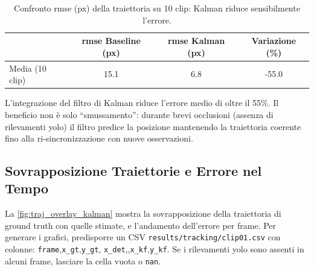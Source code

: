 \documentclass[12pt,a4paper,openright,twoside]{book}
\begin{document}
\begin{table}[t]
  \centering
  \caption{Confronto \ac{rmse} (px) della traiettoria su 10 clip: 
  Kalman riduce sensibilmente l'errore.}
  \label{tab:ablation_kalman}
  \begin{tabular}{l S[table-format=2.1] 
    S[table-format=2.1] S[table-format=2.1]}
    \toprule
    & {\textbf{\ac{rmse} Baseline (px)}} & {\textbf{\ac{rmse} Kalman (px)}} 
    & {\textbf{Variazione (\%)}} \\
    \midrule
    Media (10 clip) & 15.1 & 6.8 & -55.0 \\
    \bottomrule
  \end{tabular}
\end{table}

L'integrazione del filtro di Kalman riduce l'errore medio di oltre il 55\%. 
Il beneficio non è solo ``smussamento'': durante brevi occlusioni 
(assenza di rilevamenti \ac{yolo}) il filtro predice la posizione 
mantenendo la traiettoria coerente fino alla ri-sincronizzazione 
con nuove osservazioni.

\subsection{Sovrapposizione Traiettorie e Errore nel Tempo}
\label{sec:traiettoria-errore-tempo}

La \autoref{fig:traj_overlay_kalman} mostra la sovrapposizione 
della traiettoria di ground truth con quelle stimate, e 
l'andamento dell'errore per frame.
Per generare i grafici, predisporre un CSV 
\texttt{results/tracking/clip01.csv} con colonne:
\texttt{frame},\texttt{x\_gt},\texttt{y\_gt},
\texttt{x\_det},\texttt{},\texttt{x\_kf},\texttt{y\_kf}. 
Se i rilevamenti \ac{yolo} sono assenti in alcuni frame, 
lasciare la cella vuota o \texttt{nan}.
\end{document}
